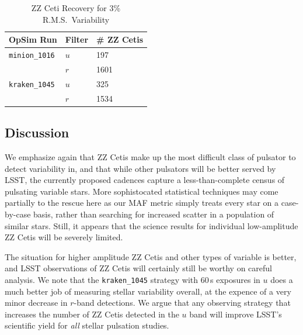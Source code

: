 \begin{table}[h]
\begin{center}
    \caption{ZZ Ceti Recovery for 3\% R.M.S.\ Variability}\label{tab:zz3pertab}
    \begin{tabular}{| l | l | l |}
    \hline
    OpSim Run & Filter & \# ZZ Cetis \\ \hline
     {\tt minion\_1016} & $u$ & 197  \\
      & $r$ & 1601 \\ \hline
    {\tt kraken\_1045}  & $u$ & 325\\
    & $r$ & 1534  \\ \hline
    \end{tabular}
\end{center}
\end{table}



\subsection{Discussion}
\label{sec:\secname:discussion}

We emphasize again that ZZ Cetis make up the most difficult class of
pulsator to detect variability in, and that while other pulsators will
be better served by LSST, the currently proposed cadences capture a
less-than-complete census of pulsating variable stars.  More
sophistocated statistical techniques may come partially to the rescue
here as our MAF metric simply treats every star on a case-by-case basis,
rather than searching for increased scatter in a population of similar
stars.  Still, it appears that the science results for individual
low-amplitude ZZ Cetis will be severely limited.

The situation for higher amplitude ZZ Cetis and other types of variable
is better, and LSST observations of ZZ Cetis will certainly still be
worthy on careful analysis.  We note that the {\tt kraken\_1045}
strategy with 60\,s exposures in $u$ does a much better job of measuring
stellar variability overall, at the expence of a very minor decrease in $r$-band
detections.  We argue that any observing strategy that increases the number of
ZZ Cetis detected in the $u$ band will improve LSST's scientific yield for
\emph{all} stellar pulsation studies.

